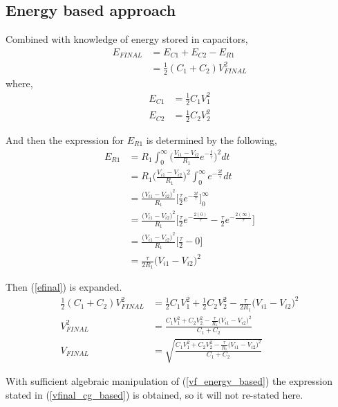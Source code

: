 \documentclass[12pt,letterpaper]{report}
\begin{document}
	\subsection{Energy based approach}
	Combined with knowledge of energy stored in capacitors,
	\begin{align}
		E_{FINAL} &= E_{C1} + E_{C2} - E_{R1} \nonumber \\
		&= \frac{1}{2} (C_1+C_2)V_{FINAL}^2 \label{efinal}
	\end{align}
	where,
	\begin{align}
		E_{C1} &= \frac{1}{2}C_1V_1^2 \nonumber\\
		E_{C2} &= \frac{1}{2}C_2V_2^2
	\end{align}

	And then the expression for $E_{R1}$ is determined by the following,
	\begin{align}
		E_{R1} &= R_1 \int_{0}^{\infty} \bigg( \frac{V_{i1} - V_{i2}}{R_1}  e^{-\frac{t}{\tau}}  \bigg)^2 dt \nonumber \\
		&=R_1 \bigg( \frac{V_{i1} - V_{i2}}{R_1}  \bigg)^2 \int_{0}^{\infty}    e^{-\frac{2t}{\tau}}  dt \nonumber \\
		&=  \frac{\big(V_{i1} - V_{i2}\big)^2}{R_1}  \bigg[ \frac{\tau}{2} e^{-\frac{2t}{\tau}} \bigg]_{0}^{\infty} \nonumber\\
		&=  \frac{\big(V_{i1} - V_{i2}\big)^2}{R_1}  \bigg[ \frac{\tau}{2} e^{-\frac{2(0)}{\tau}} - \frac{\tau}{2} e^{-\frac{2(\infty)}{\tau}} \bigg] \nonumber \\
		&=  \frac{\big(V_{i1} - V_{i2}\big)^2}{R_1}  \bigg[ \frac{\tau}{2}  - 0 \bigg] \nonumber \\
		&= \frac{\tau}{2R_1} \big(V_{i1} - V_{i2}\big)^2
	\end{align}
	
	Then (\ref{efinal}) is expanded.
	\begin{align}
		\frac{1}{2} (C_1+C_2)V_{FINAL}^2 &= \frac{1}{2}C_1V_1^2 +\frac{1}{2}C_2V_2^2 - \frac{\tau}{2R_1} \big(V_{i1} - V_{i2}\big)^2 \nonumber \\
		V_{FINAL}^2 &= \frac{C_1V_1^2 +C_2V_2^2 - \frac{\tau}{R_1} \big(V_{i1} - V_{i2}\big)^2}{C_1+C_2} \nonumber \\
		V_{FINAL} &= \sqrt{\frac{C_1V_1^2 +C_2V_2^2 - \frac{\tau}{R_1} \big(V_{i1} - V_{i2}\big)^2}{C_1+C_2}} \label{vf_energy_based}
	\end{align}
	
	With sufficient algebraic manipulation of (\ref{vf_energy_based}) the expression stated in (\ref{vfinal_cg_based}) is obtained, so it will not re-stated here.
\end{document}
